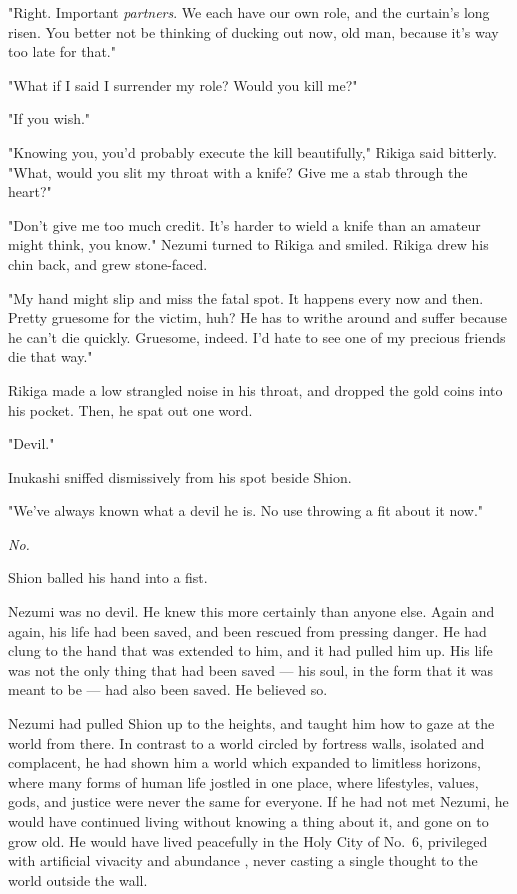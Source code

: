 "Right. Important \emph{partners}. We each have our own role, and the curtain's
long risen. You better not be thinking of ducking out now, old man,
because it's way too late for that."

"What if I said I surrender my role? Would you kill me?"

"If you wish."

"Knowing you, you'd probably execute the kill beautifully," Rikiga said
bitterly. "What, would you slit my throat with a knife? Give me a stab
through the heart?"

"Don't give me too much credit. It's harder to wield a knife than an
amateur might think, you know." Nezumi turned to Rikiga and smiled.
Rikiga drew his chin back, and grew stone-faced.

"My hand might slip and miss the fatal spot. It happens every now and
then. Pretty gruesome for the victim, huh? He has to writhe around and
suffer because he can't die quickly. Gruesome, indeed. I'd hate to see
one of my precious friends die that way."

Rikiga made a low strangled noise in his throat, and dropped the gold
coins into his pocket. Then, he spat out one word.

"Devil."

Inukashi sniffed dismissively from his spot beside Shion.

"We've always known what a devil he is. No use throwing a fit about it
now."

\emph{No.}

Shion balled his hand into a fist.

Nezumi was no devil. He knew this more certainly than anyone else. Again
and again, his life had been saved, and been rescued from pressing
danger. He had clung to the hand that was extended to him, and it had
pulled him up. His life was not the only thing that had been saved --- his
soul, in the form that it was meant to be --- had also been saved. He
believed so.

Nezumi had pulled Shion up to the heights, and taught him how to gaze at
the world from there. In contrast to a world circled by fortress walls,
isolated and complacent, he had shown him a world which expanded to
limitless horizons, where many forms of human life jostled in one place,
where lifestyles, values, gods, and justice were never the same for
everyone. If he had not met Nezumi, he would have continued living
without knowing a thing about it, and gone on to grow old. He would have
lived peacefully in the Holy City of No.~6, privileged with artificial
vivacity and abundance , never casting a single thought to the world
outside the wall.


